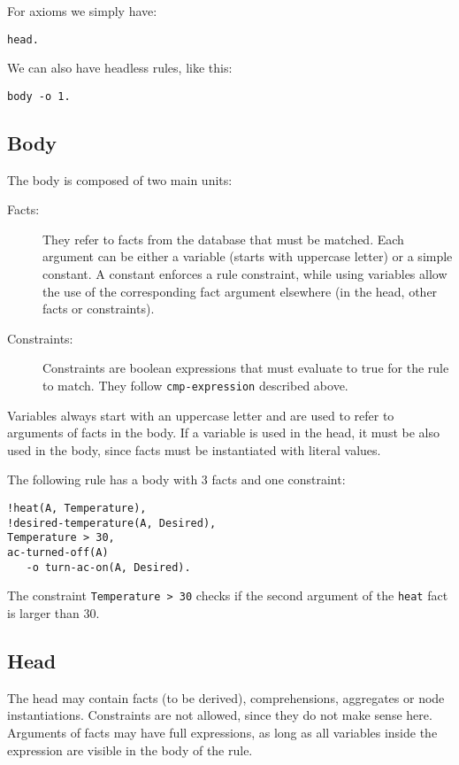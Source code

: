 \documentclass[11pt]{article}
\begin{document}
For axioms we simply have:

\begin{verbatim}
head.
\end{verbatim}

We can also have headless rules, like this:

\begin{verbatim}
body -o 1.
\end{verbatim}

\subsection{Body}

The body is composed of two main units:

\begin{description}
\item[Facts:] They refer to facts from the database that must be matched. Each argument can be either a variable (starts with uppercase letter) or a simple constant. A constant enforces a rule constraint, while using variables allow the use of the corresponding fact argument elsewhere (in the head, other facts or constraints).
\item[Constraints:] Constraints are boolean expressions that must evaluate to true for the rule to match. They follow \texttt{cmp-expression} described above.
\end{description}

Variables always start with an uppercase letter and are used to refer to arguments of facts in the body. If a variable is used in the head,
it must be also used in the body, since facts must be instantiated with literal values.

The following rule has a body with 3 facts and one constraint:

\begin{verbatim}
!heat(A, Temperature),
!desired-temperature(A, Desired),
Temperature > 30,
ac-turned-off(A)
   -o turn-ac-on(A, Desired).
\end{verbatim}

The constraint \texttt{Temperature > 30} checks if the second argument of the \texttt{heat} fact is larger than 30.

\subsection{Head}

The head may contain facts (to be derived), comprehensions, aggregates or node instantiations. Constraints are not allowed, since they do not make sense here.
Arguments of facts may have full expressions, as long as all variables inside the expression are visible in the body of the rule.
\end{document}
